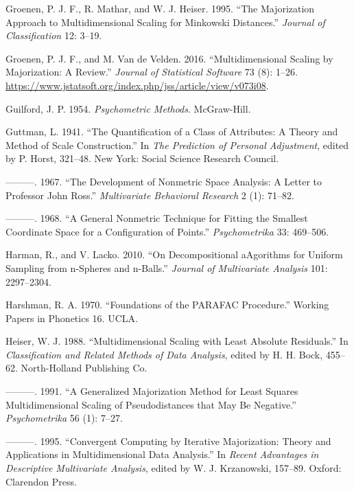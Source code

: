 \documentclass[
  12pt,
  letterpaper,
  DIV=11,
  numbers=noendperiod]{scrreprt}
\newlength{\cslhangindent}
\newenvironment{CSLReferences}[2] %
 {\begin{list}{}{%
  \setlength{\itemindent}{0pt}
  \setlength{\leftmargin}{0pt}
  \setlength{\parsep}{0pt}
  \ifodd #1
   \setlength{\leftmargin}{\cslhangindent}
   \setlength{\itemindent}{-1\cslhangindent}
  \fi
  \setlength{\itemsep}{#2\baselineskip}}}
 {\end{list}}
\theoremstyle{remark}
\begin{document}
\begin{CSLReferences}{1}{0}
Groenen, P. J. F., R. Mathar, and W. J. Heiser. 1995. {``{The
Majorization Approach to Multidimensional Scaling for Minkowski
Distances}.''} \emph{Journal of Classification} 12: 3--19.

Groenen, P. J. F., and M. Van de Velden. 2016. {``{Multidimensional
Scaling by Majorization: A Review}.''} \emph{Journal of Statistical
Software} 73 (8): 1--26.
\url{https://www.jstatsoft.org/index.php/jss/article/view/v073i08}.

Guilford, J. P. 1954. \emph{Psychometric Methods}. McGraw-Hill.

Guttman, L. 1941. {``{The Quantification of a Class of Attributes: A
Theory and Method of Scale Construction}.''} In \emph{The Prediction of
Personal Adjustment}, edited by P. Horst, 321--48. New York: Social
Science Research Council.

---------. 1967. {``{The Development of Nonmetric Space Analysis: A
Letter to Professor John Ross}.''} \emph{Multivariate Behavioral
Research} 2 (1): 71--82.

---------. 1968. {``{A General Nonmetric Technique for Fitting the
Smallest Coordinate Space for a Configuration of Points}.''}
\emph{Psychometrika} 33: 469--506.

Harman, R., and V. Lacko. 2010. {``{On Decompositional aAgorithms for
Uniform Sampling from n-Spheres and n-Balls}.''} \emph{Journal of
Multivariate Analysis} 101: 2297--2304.

Harshman, R. A. 1970. {``{Foundations of the PARAFAC Procedure}.''}
Working Papers in Phonetics 16. UCLA.

Heiser, W. J. 1988. {``{Multidimensional Scaling with Least Absolute
Residuals}.''} In \emph{Classification and Related Methods of Data
Analysis}, edited by H. H. Bock, 455--62. North-Holland Publishing Co.

---------. 1991. {``{A Generalized Majorization Method for Least Squares
Multidimensional Scaling of Pseudodistances that May Be Negative}.''}
\emph{Psychometrika} 56 (1): 7--27.

---------. 1995. {``{Convergent Computing by Iterative Majorization:
Theory and Applications in Multidimensional Data Analysis}.''} In
\emph{Recent Advantages in Descriptive Multivariate Analysis}, edited by
W. J. Krzanowski, 157--89. Oxford: Clarendon Press.


\end{CSLReferences}
\end{document}
